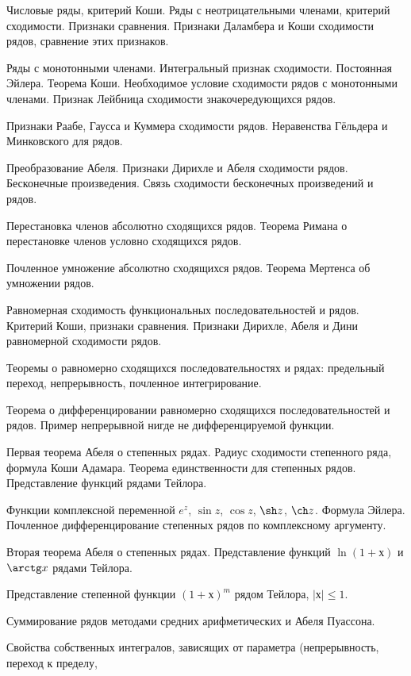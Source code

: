 \documentclass[a4paper]{article}
\begin{document}
\begin{nums}{-3}
\item Числовые ряды, критерий Коши. Ряды с неотрицательными членами, критерий сходимости. Признаки
сравнения. Признаки Даламбера и Коши сходимости рядов, сравнение этих признаков.
\item Ряды с монотонными членами. Интегральный признак сходимости. Постоянная Эйлера. Теорема Коши.
Необходимое условие сходимости рядов с монотонными членами. Признак Лейбница сходимости знакочередующихся рядов.
\item Признаки Раабе, Гаусса и Куммера сходимости рядов. Неравенства Гёльдера и Минковского для рядов.
\item Преобразование Абеля. Признаки Дирихле и Абеля сходимости рядов. Бесконечные произведения. Связь
сходимости бесконечных произведений и рядов.
\item Перестановка членов абсолютно сходящихся рядов. Теорема Римана о перестановке членов условно сходящихся рядов.
\item Почленное умножение абсолютно сходящихся рядов. Теорема Мертенса об умножении рядов.
\item Равномерная сходимость функциональных последовательностей и рядов. Критерий Коши, признаки сравнения.
Признаки Дирихле, Абеля и Дини равномерной сходимости рядов.
\item Теоремы о равномерно сходящихся последовательностях и рядах: предельный переход, непрерывность,
почленное интегрирование.
\item Теорема о дифференцировании равномерно сходящихся последовательностей и рядов. Пример непрерывной
нигде не дифференцируемой функции.
\item Первая теорема Абеля о степенных рядах. Радиус сходимости степенного  ряда, формула Коши Адамара.
Теорема единственности для степенных рядов. Представление функций рядами Тейлора.
\item Функции комплексной переменной $e^z$, $\sin z$, $\cos z$, $\sh z$, $\ch z$. Формула Эйлера.
Почленное дифференцирование степенных рядов по комплексному аргументу.
\item Вторая теорема Абеля о степенных рядах.  Представление функций $\ln(1 + х)$ и $\arctg x$ рядами Тейлора.
\item Представление степенной функции $(1 + х)^m$ рядом Тейлора, $|х| \le 1$.
\item Суммирование рядов методами средних арифметических и Абеля Пуассона.
\item Свойства собственных интегралов, зависящих от параметра (непрерывность, переход к пределу,

\end{nums}
\end{document}
